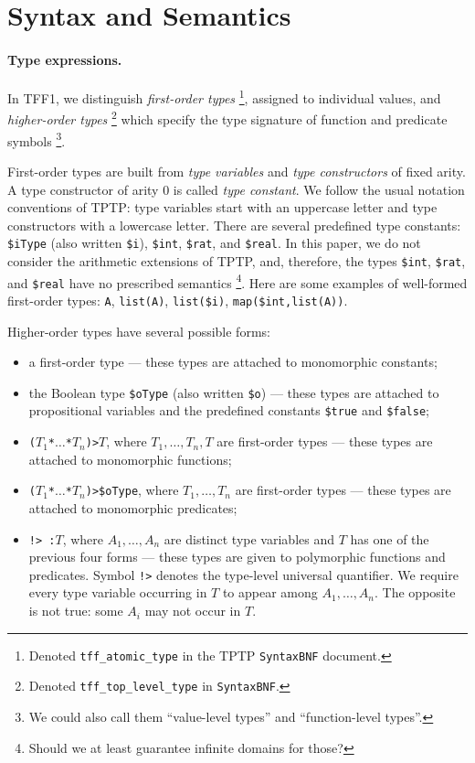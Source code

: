 \section{Syntax and Semantics} \label{sec_logic}

\paragraph{Type expressions.} In TFF1, we distinguish
{\em first-order types}%
\footnote{Denoted {\tt tff\_atomic\_type} in the
TPTP {\tt SyntaxBNF} document.}, assigned to individual values,
and {\em higher-order types}%
\footnote{Denoted {\tt tff\_top\_level\_type} in {\tt SyntaxBNF}.}
which specify the type signature of function and predicate symbols%
\footnote{We could also call them ``value-level types'' and
``function-level types''.}.

First-order types are built from {\em type variables\/}
and {\em type constructors\/} of fixed arity. A type constructor
of arity 0 is called {\em type constant}. We follow the usual
notation conventions of TPTP: type variables start with an
uppercase letter and type constructors with a lowercase letter.
There are several predefined type constants:
\verb+$iType+ (also written \verb+$i+),
\verb+$int+, \verb+$rat+, and \verb+$real+. In this paper,
we do not consider the arithmetic extensions of TPTP, and,
therefore, the types \verb+$int+, \verb+$rat+, and \verb+$real+
have no prescribed semantics%
\footnote{Should we at least guarantee infinite domains for those?}.
Here are some examples of well-formed first-order types:
\verb+A+, \verb+list(A)+, \verb+list($i)+, \verb+map($int,list(A))+.

Higher-order types have several possible forms:
\begin{itemize}
\item a first-order type --- these types are attached to
monomorphic constants;
\item the Boolean type \verb+$oType+ (also written \verb+$o+)
--- these types are attached to propositional variables and
the predefined constants \verb+$true+ and \verb+$false+;
\item {\tt ($T_1$\;*\;$\dots$\;*\;$T_n$)\;>\;$T$},
where $T_1,\dots,T_n,T$ are first-order types ---
these types are attached to monomorphic functions;
\item {\tt ($T_1$\;*\;$\dots$\;*\;$T_n$)\;>\;\$oType},
where $T_1,\dots,T_n$ are first-order types --- these types
are attached to monomorphic predicates;
\item {\tt !>\,:\;$T$}, where $A_1,\dots,A_n$ are distinct
type variables and $T$ has one of the previous four forms ---
these types are given to polymorphic functions and predicates.
Symbol {\tt !>} denotes the type-level universal quantifier.
We require every type variable occurring in $T$ to appear
among $A_1,\dots,A_n$. The opposite is not true:
some $A_i$ may not occur in $T$.
\end{itemize}

